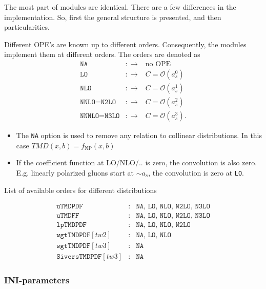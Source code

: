 \documentclass[prd,nofootinbib,eqsecnum,final]{revtex4}
\renewcommand{\(}{\left(}
\renewcommand{\)}{\right)}
\renewcommand{\[}{\left[}
\renewcommand{\]}{\right]}
\begin{document}
The most part of modules are identical. There are a few differences in the implementation. So, first the general structure is presented, and then particularities.

Different OPE's are known up to different orders. Consequently, the modules implement them at different orders. The orders are denoted as
\begin{eqnarray*}
\texttt{NA}&:\to & \text{no OPE}
\\
\texttt{LO}&:\to & C=\mathcal{O}(a_s^0)
\\
\texttt{NLO}&:\to & C=\mathcal{O}(a_s^1)
\\
\texttt{NNLO}=\texttt{N2LO}&:\to & C=\mathcal{O}(a_s^2)
\\
\texttt{NNNLO}=\texttt{N3LO}&:\to & C=\mathcal{O}(a_s^3).
\end{eqnarray*}
\begin{itemize}
\item The \texttt{NA} option is used to remove any relation to collinear distributions. In this case $TMD(x,b)=f_{\text{NP}}(x,b)$
\item If the coefficient function at LO/NLO/.. is zero, the convolution is also zero. E.g. linearly polarized gluons start at $\sim a_s$, the convolution is zero at \texttt{LO}. 
\end{itemize}
\begin{center}
List of available orders for different distributions
\end{center}
\begin{eqnarray*}
\texttt{uTMDPDF}&:& \texttt{NA, LO, NLO, N2LO, N3LO}
\\
\texttt{uTMDFF}&:& \texttt{NA, LO, NLO, N2LO, N3LO}
\\
\texttt{lpTMDPDF}&:& \texttt{NA, LO, NLO, N2LO}
\\
\texttt{wgtTMDPDF}[tw2]&:& \texttt{NA, LO, NLO}
\\
\texttt{wgtTMDPDF}[tw3]&:& \texttt{NA}
\\
\texttt{SiversTMDPDF}[tw3]&:& \texttt{NA}
\end{eqnarray*}

\subsubsection{INI-parameters}
\end{document}
